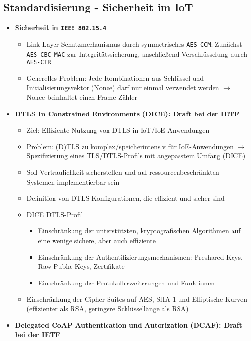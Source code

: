 \subsection{Standardisierung - Sicherheit im IoT}
\begin{itemize}
	\item \textbf{Sicherheit in \texttt{IEEE 802.15.4}}
	\begin{itemize}
		\item Link-Layer-Schutzmechanismus durch symmetrisches \texttt{AES-CCM}: Zunächst \texttt{AES-CBC-MAC} zur Integritätssicherung, anschließend Verschlüsselung durch \texttt{AES-CTR}
		\item Generelles Problem: Jede Kombinationen aus Schlüssel und Initialisierungsvektor (Nonce) darf nur einmal verwendet werden \(\rightarrow\) Nonce beinhaltet einen Frame-Zähler
	\end{itemize}
	\item \textbf{DTLS In Constrained Environments (DICE): Draft bei der IETF}
	\begin{itemize}
		\item Ziel: Effiziente Nutzung von DTLS in IoT/IoE-Anwendungen
		\item Problem: (D)TLS zu komplex/speicherintensiv für IoE-Anwendungen \(\rightarrow\) Spezifizierung eines TLS/DTLS-Profils mit angepasstem Umfang (DICE)
		\item Soll Vertraulichkeit sicherstellen und auf ressourcenbeschränkten Systemen implementierbar sein
		\item Definition von DTLS-Konfigurationen, die effizient und sicher sind
		\item DICE DTLS-Profil
		\begin{itemize}
			\item Einschränkung der unterstützten, kryptografischen Algorithmen auf eine wenige sichere, aber auch effiziente
			\item Einschränkung der Authentifizierungsmechanismen: Preshared Keys, Raw Public Keys, Zertifikate
			\item Einschränkung der Protokollerweiterungen und Funktionen
		\end{itemize}
		\item Einschränkung der Cipher-Suites auf AES, SHA-1 und Elliptische Kurven (effizienter als RSA, geringere Schlüssellänge als RSA)
	\end{itemize}
	\item \textbf{Delegated CoAP Authentication und Autorization (DCAF): Draft bei der IETF}
	\begin{itemize}

\end{itemize}
\end{itemize}

